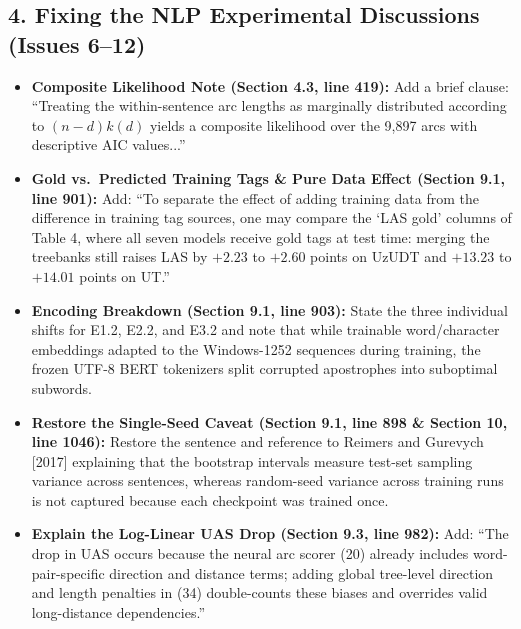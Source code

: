\documentclass[11pt,a4paper]{article}
\begin{document}
\subsection*{4. Fixing the NLP Experimental Discussions (Issues 6--12)}
\begin{itemize}
    \item \textbf{Composite Likelihood Note (Section 4.3, line 419):} Add a brief clause: ``Treating the within-sentence arc lengths as marginally distributed according to $(n-d)k(d)$ yields a composite likelihood over the 9,897 arcs with descriptive AIC values...''
    \item \textbf{Gold vs.\ Predicted Training Tags & Pure Data Effect (Section 9.1, line 901):} Add: ``To separate the effect of adding training data from the difference in training tag sources, one may compare the `LAS gold' columns of Table 4, where all seven models receive gold tags at test time: merging the treebanks still raises LAS by $+2.23$ to $+2.60$ points on UzUDT and $+13.23$ to $+14.01$ points on UT.''
    \item \textbf{Encoding Breakdown (Section 9.1, line 903):} State the three individual shifts for E1.2, E2.2, and E3.2 and note that while trainable word/character embeddings adapted to the Windows-1252 sequences during training, the frozen UTF-8 BERT tokenizers split corrupted apostrophes into suboptimal subwords.
    \item \textbf{Restore the Single-Seed Caveat (Section 9.1, line 898 & Section 10, line 1046):} Restore the sentence and reference to Reimers and Gurevych [2017] explaining that the bootstrap intervals measure test-set sampling variance across sentences, whereas random-seed variance across training runs is not captured because each checkpoint was trained once.
    \item \textbf{Explain the Log-Linear UAS Drop (Section 9.3, line 982):} Add: ``The drop in UAS occurs because the neural arc scorer (20) already includes word-pair-specific direction and distance terms; adding global tree-level direction and length penalties in (34) double-counts these biases and overrides valid long-distance dependencies.''
\end{itemize}
\end{document}
